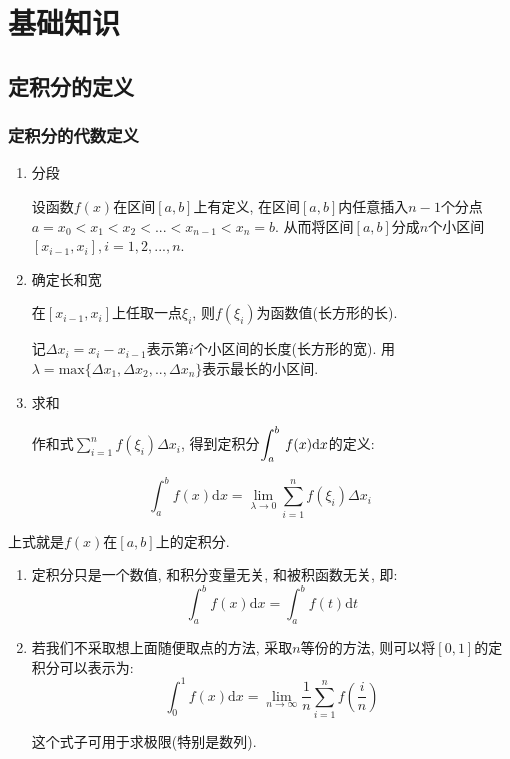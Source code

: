 \section{基础知识}
\subsection{定积分的定义}
\subsubsection{定积分的代数定义}
\begin{enumerate}
    \item 分段 \par 设函数$ f(x) $在区间$ [a,b] $上有定义, 在区间$ [a,b] $内任意插入$ n-1 $个分点$ a=x_{0}<x_{1}<x_{2}<...<x_{n-1}<x_{n}=b $. 从而将区间$ [a,b] $分成$ n $个小区间$ [x_{i-1},x_{i}], i=1,2,...,n $.
    \item 确定长和宽 \par 在$ [x_{i-1},x_{i}] $上任取一点$ \xi_{i} $, 则$ f(\xi_{i}) $为函数值(长方形的长). \par 记$ \Delta x_{i}=x_{i}-x_{i-1} $表示第$ i $个小区间的长度(长方形的宽). 用$ \lambda=\mathrm{max}\{\Delta x_{1}, \Delta x_{2},..,\Delta x_{n}\} $表示最长的小区间.
    \item 求和 \par  作和式$ \sum\limits^{n}_{i=1}f(\xi_{i})\Delta x_{i} $, 得到定积分$ \displaystyle\int_{a}^{b}\hspace{.2em}f(x)\mathrm{d}x $的定义:
\end{enumerate}
\begin{equation*}
    \displaystyle\int_{a}^{b}f(x)\mathrm{d}x=\lim\limits_{\lambda\rightarrow 0}\sum_{i=1}^{n}f(\xi_{i})\Delta x_{i}
\end{equation*}\par 上式就是$ f(x) $在$ [a,b] $上的定积分.
\begin{tcolorbox}
    \begin{enumerate}
        \item 定积分只是一个数值, 和积分变量无关, 和被积函数无关, 即:
              \begin{equation*}
                  \displaystyle\int_{a}^{b}f(x)\mathrm{d}x=\displaystyle\int_{a}^{b}f(t)\mathrm{d}t
              \end{equation*}
        \item 若我们不采取想上面随便取点的方法, 采取$ n $等份的方法, 则可以将$ [0,1] $的定积分可以表示为:
              \begin{equation*}
                  \displaystyle\int_{0}^{1}f(x)\mathrm{d}x=\lim\limits_{n\rightarrow\infty}\frac{1}{n}\sum_{i=1}^{n}f(\frac{i}{n})
              \end{equation*}\par 这个式子可用于求极限(特别是数列).
    \end{enumerate}
\end{tcolorbox}
